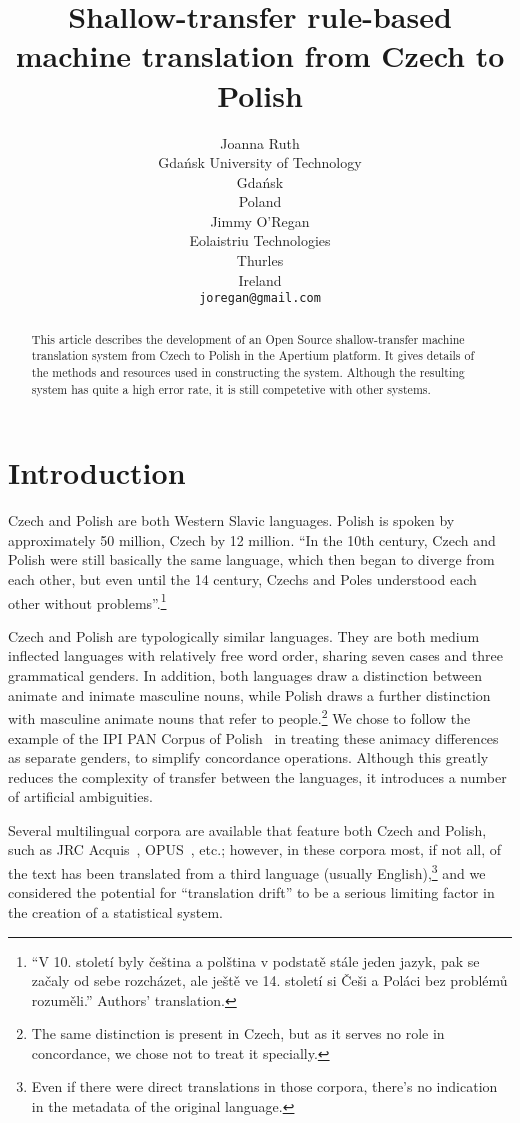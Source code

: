 \documentclass[11pt]{article}
\title{Shallow-transfer rule-based machine translation from Czech to Polish}
\author{Joanna Ruth\\
  Gdańsk University of Technology \\
  Gdańsk \\
  Poland \\
  \And
  Jimmy O'Regan \\
  Eolaistriu Technologies \\
  Thurles \\
  Ireland \\  
  {\tt joregan@gmail.com}}
\date{}
\begin{document}
\maketitle

\begin{abstract}
This article describes the development of an Open Source shallow-transfer machine translation
system from Czech to Polish in the Apertium platform. It gives details of the
methods and resources used in constructing the system. Although the resulting system
has quite a high error rate, it is still competetive with other systems.
\end{abstract}

\section{Introduction}

Czech and Polish are both Western Slavic languages. Polish is spoken by
approximately 50 million, Czech by 12 million.
``In the 10th century, Czech and Polish were still basically the same language, 
which then began to diverge from each other, but even until the 14 century, 
Czechs and Poles understood each other without problems''.\footnote{``V 10. 
století byly čeština a polština v podstatě stále jeden jazyk, pak se začaly 
od sebe rozcházet, ale ještě ve 14. století si Češi a Poláci bez problémů rozuměli.''
Authors' translation.}~\citep{wiki:polstina}

Czech and Polish are typologically similar languages. They are both medium inflected 
languages with relatively free word order, sharing seven cases and three grammatical 
genders. In addition, both languages draw a distinction between animate and inimate 
masculine nouns, while Polish draws a further distinction with masculine animate 
nouns that refer to people.\footnote{The same distinction is present in Czech, but
as it serves no role in concordance, we chose not to treat it specially.}
We chose to 
follow the example of the IPI PAN Corpus of Polish~\citep{prze:04ce} in treating these 
animacy differences
as separate genders, to simplify concordance operations. 
Although this greatly reduces the complexity of transfer between 
the languages, it introduces a number of artificial ambiguities.

Several multilingual corpora are available that feature both
Czech and Polish, such as JRC Acquis~\citep{Steinberger2006}, 
OPUS~\citep{Tiedemann2009}, etc.; however, in these corpora
most, if not all, of the text has been translated from a third language
(usually English),\footnote{Even if there were direct translations in those 
corpora, there's no indication in the metadata of the original language.}
and we considered the potential for ``translation drift'' to be a 
serious limiting factor in the creation of a statistical system.
\end{document}
